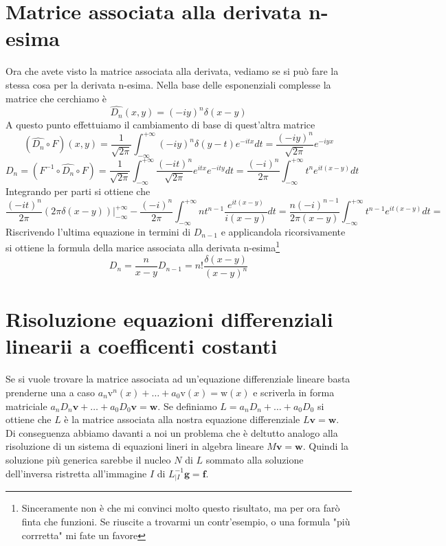 \documentclass[11pt,a4paper]{report}
\newcommand{\vettore}[1]{\mathbf{#1}}
\newcommand{\vettorec}[1]{\textrm{#1}}
\theoremstyle{definition}
\theoremstyle{plain}
\theoremstyle{plain}
\begin{document}
		\section{Matrice associata alla derivata n-esima}
			Ora che avete visto la matrice associata alla derivata, vediamo se si può fare la stessa cosa per la derivata n-esima.
			Nella base delle esponenziali complesse la matrice che cerchiamo è 
			\begin{equation}
				\widehat{D_n}(x,y)=(-iy)^n\delta(x-y)
			\end{equation}
			A questo punto effettuiamo il cambiamento di base di quest'altra matrice
			\[
				(\widehat{D_n}\circ F)(x,y)=
				\frac{1}{\sqrt{2\pi}}\int_{-\infty}^{+\infty}(-iy)^n\delta(y-t)e^{-itx}dt=
				\frac{(-iy)^n}{\sqrt{2\pi}}e^{-iyx}
			\]
			\[
				D_n=(F^{-1}\circ \widehat{D_n}\circ F)=
				\frac{1}{\sqrt{2\pi}}\int_{-\infty}^{+\infty}\frac{(-it)^n}{\sqrt{2\pi}}e^{itx}e^{-ity}dt=
				\frac{(-i)^n}{2\pi}\int_{-\infty}^{+\infty}t^n e^{it(x-y)}dt
			\]
			Integrando per parti si ottiene che
			\[
				\frac{(-it)^n}{2\pi}(2\pi\delta(x-y))\bigg\rvert_{-\infty}^{+\infty}-
				\frac{(-i)^n}{2\pi}\int_{-\infty}^{+\infty}nt^{n-1}\frac{e^{it(x-y)}}{i(x-y)}dt=
				\frac{n(-i)^{n-1}}{2\pi(x-y)}\int_{-\infty}^{+\infty}t^{n-1}e^{it(x-y)}dt=	
			\]
			Riscrivendo l'ultima equazione in termini di $D_{n-1}$ e applicandola ricorsivamente si ottiene la formula della marice associata alla derivata n-esima\footnote{Sinceramente non è che mi convinci molto questo risultato, ma per ora farò finta che funzioni. Se riuscite a trovarmi un contr'esempio, o una formula "più corrretta" mi fate un favore}
			\begin{equation}
				D_{n}=\frac{n}{x-y}D_{n-1}=n!\frac{\delta(x-y)}{(x-y)^n}
			\end{equation}	



		\section{Risoluzione equazioni differenziali linearii a coefficenti costanti}
			Se si vuole trovare la matrice associata ad un'equazione differenziale lineare basta prenderne una a caso $a_n\vettorec v^{n}(x)+\dots +a_0\vettorec v(x)=\vettorec w(x)$ e scriverla in forma matriciale $a_nD_n\vettore v+\dots+a_0D_0\vettore v=\vettore w$.\newline
			Se definiamo $L=a_nD_n+\dots+a_0D_0$ si ottiene che $L$ è la matrice associata alla nostra equazione differenziale $L\vettore v=\vettore w$.\newline
			Di conseguenza abbiamo davanti a noi un problema che è deltutto analogo alla risoluzione di un sistema di equazioni lineri in algebra lineare $M\vettore v=\vettore w$.\newline
			Quindi la soluzione più generica sarebbe il nucleo $N$ di $L$ sommato alla soluzione dell'inversa ristretta all'immagine $I$ di $L^{-1}_{|I}\vettore g=\vettore f$.\newline
\end{document}
